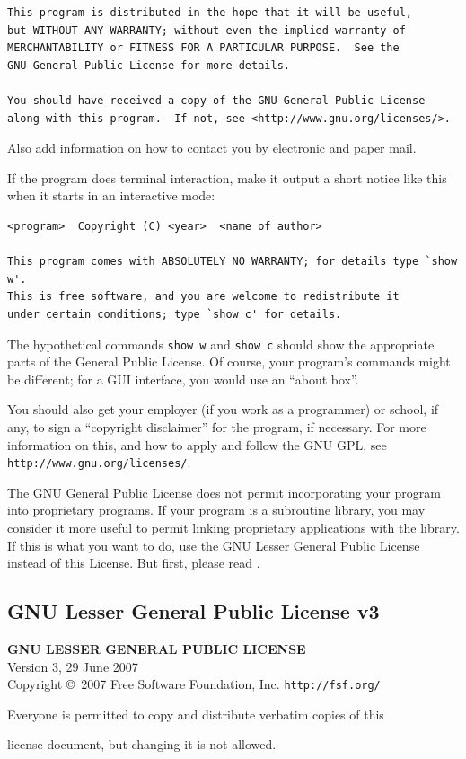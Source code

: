 \documentclass[10pt]{article}
\begin{document}
\begin{enumerate}
{\begin{verbatim}
This program is distributed in the hope that it will be useful,
but WITHOUT ANY WARRANTY; without even the implied warranty of
MERCHANTABILITY or FITNESS FOR A PARTICULAR PURPOSE.  See the
GNU General Public License for more details.

You should have received a copy of the GNU General Public License
along with this program.  If not, see <http://www.gnu.org/licenses/>.
\end{verbatim}
}

Also add information on how to contact you by electronic and paper mail.

If the program does terminal interaction, make it output a short
notice like this when it starts in an interactive mode:

{\footnotesize
\begin{verbatim}
<program>  Copyright (C) <year>  <name of author>

This program comes with ABSOLUTELY NO WARRANTY; for details type `show w'.
This is free software, and you are welcome to redistribute it
under certain conditions; type `show c' for details.
\end{verbatim}
}

The hypothetical commands {\tt show w} and {\tt show c} should show
the appropriate
parts of the General Public License.  Of course, your program's commands
might be different; for a GUI interface, you would use an ``about box''.

You should also get your employer (if you work as a programmer) or
school, if any, to sign a ``copyright disclaimer'' for the program, if
necessary.  For more information on this, and how to apply and follow
the GNU GPL, see \texttt{http://www.gnu.org/licenses/}.

The GNU General Public License does not permit incorporating your
program into proprietary programs.  If your program is a subroutine
library, you may consider it more useful to permit linking proprietary
applications with the library.  If this is what you want to do, use
the GNU Lesser General Public License instead of this License.  But
first, please read .

\end{enumerate}

\clearpage
\subsection{GNU Lesser General Public License v3}
\begin{center}
{\parindent 0in
\textbf{GNU LESSER GENERAL PUBLIC LICENSE}\\
Version 3, 29 June 2007 \\

Copyright \copyright\  2007 Free Software Foundation, Inc. \texttt{http://fsf.org/}

\bigskip
Everyone is permitted to copy and distribute verbatim copies of this

license document, but changing it is not allowed.}

\end{center}
\end{document}
